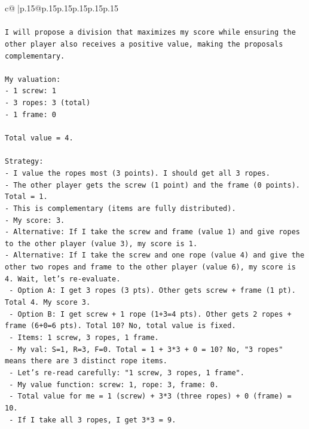 \documentclass{article}
\begin{document}
{\begin{supertabular}{c@{$\;$}|p{.15\linewidth}@{}p{.15\linewidth}p{.15\linewidth}p{.15\linewidth}p{.15\linewidth}p{.15\linewidth}}
{{{\\ 
\\ 
\texttt{I will propose a division that maximizes my score while ensuring the other player also receives a positive value, making the proposals complementary.} \\
\\ 
\texttt{My valuation:} \\
\texttt{{-} 1 screw: 1} \\
\texttt{{-} 3 ropes: 3 (total)} \\
\texttt{{-} 1 frame: 0} \\
\\ 
\texttt{Total value = 4.} \\
\\ 
\texttt{Strategy:} \\
\texttt{{-} I value the ropes most (3 points). I should get all 3 ropes.} \\
\texttt{{-} The other player gets the screw (1 point) and the frame (0 points). Total = 1.} \\
\texttt{{-} This is complementary (items are fully distributed).} \\
\texttt{{-} My score: 3.} \\
\texttt{{-} Alternative: If I take the screw and frame (value 1) and give ropes to the other player (value 3), my score is 1.} \\
\texttt{{-} Alternative: If I take the screw and one rope (value 4) and give the other two ropes and frame to the other player (value 6), my score is 4. Wait, let's re{-}evaluate.} \\
\texttt{  {-} Option A: I get 3 ropes (3 pts). Other gets screw + frame (1 pt). Total 4. My score 3.} \\
\texttt{  {-} Option B: I get screw + 1 rope (1+3=4 pts). Other gets 2 ropes + frame (6+0=6 pts). Total 10? No, total value is fixed.} \\
\texttt{    {-} Items: 1 screw, 3 ropes, 1 frame.} \\
\texttt{    {-} My val: S=1, R=3, F=0. Total = 1 + 3*3 + 0 = 10? No, "3 ropes" means there are 3 distinct rope items.} \\
\texttt{    {-} Let's re{-}read carefully: "1 screw, 3 ropes, 1 frame".} \\
\texttt{    {-} My value function: screw: 1, rope: 3, frame: 0.} \\
\texttt{    {-} Total value for me = 1 (screw) + 3*3 (three ropes) + 0 (frame) = 10.} \\
\texttt{    {-} If I take all 3 ropes, I get 3*3 = 9.} \\
}}}
\end{supertabular}}
\end{document}
